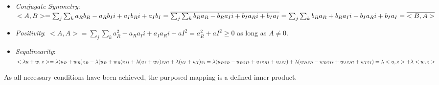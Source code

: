 \documentclass[11pt]{article}
\begin{document}
\begin{itemize}
    \item \textit{Conjugate Symmetry}: $<A, B> = \sum_j \sum_k a_{R} b_{R} - a_{R}b_{I}i + a_{I}b_{R}i + a_{I}b_{I} \\= \overline{\sum_j \sum_k b_{R}a_{R}  - b_{R}a_{I}i + b_{I}a_{R}i + b_{I}a_{I}} = \sum_j \sum_k b_{R}a_{R} + b_{R}a_{I}i - b_{I}a_{R}i + b_{I}a_{I} = \overline{<B, A>} $
    \item \textit{Positivity}: $<A, A> = \sum_j \sum_k a_R^2 - a_R a_I i + a_I a_R i + aI^2 = a_R^2 + aI^2 \geq 0$ as long as $A \neq 0$.
    \item \textit{Sequlinearity}: $<\lambda u + w, z> = \lambda (u_R + w_R)z_R - \lambda (u_R + w_R)z_I i +  \lambda (u_I + w_I)z_R i +  \lambda (u_I + w_I)z_i \\
    = \lambda(u_R z_R - u_R z_I i + u_I z_R i + u_I z_I) + \lambda(w_R z_R - w_R z_I i + w_I z_R i + w_I z_I) \\
    = \lambda <u, z> + \lambda <w, z> $
\end{itemize}

As all necessary conditions have been achicved, the purposed mapping is a defined inner product.
\end{document}

